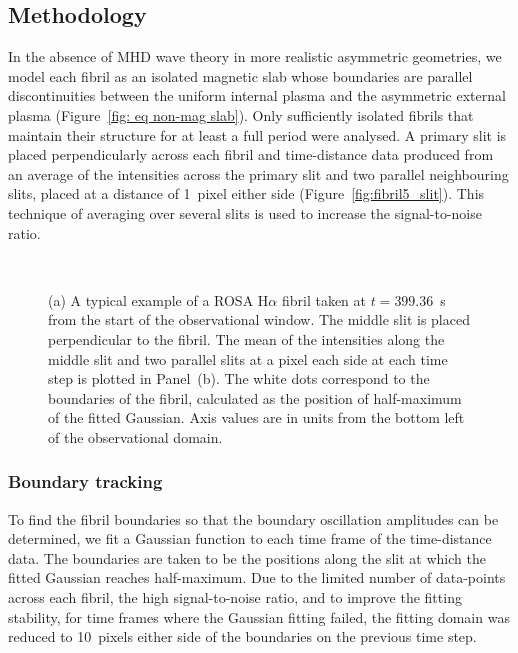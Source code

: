 \documentclass[12pt]{../style-files/ociamthesis}
\newcommand{\figdir}{../main/figures/chpt-4/} %
\begin{document}
\subsection{Methodology}

In the absence of MHD wave theory in more realistic asymmetric geometries, we model each fibril as an isolated magnetic slab whose boundaries are parallel discontinuities between the uniform internal plasma and the asymmetric external plasma (Figure~\ref{fig: eq non-mag slab}). Only sufficiently isolated fibrils that maintain their structure for at least a full period were analysed. A primary slit is placed perpendicularly across each fibril and time-distance data produced from an average of the intensities across the primary slit and two parallel neighbouring slits, placed at a distance of 1~pixel either side (Figure~\ref{fig:fibril5_slit}). This technique of averaging over several slits is used to increase the signal-to-noise ratio.

\begin{figure}
	\centering
	 \\
	\caption{(a) A typical example of a ROSA H$\alpha$ fibril taken at $t=399.36$~s from the start of the observational window. The middle slit is placed perpendicular to the fibril. The mean of the intensities along the middle slit and two parallel slits at a pixel each side at each time step is plotted in Panel~(b). The white dots correspond to the boundaries of the fibril, calculated as the position of half-maximum of the fitted Gaussian. Axis values are in units from the bottom left of the observational domain.}
\end{figure}


\subsubsection{Boundary tracking} \label{sec:boundary tracking}

To find the fibril boundaries so that the boundary oscillation amplitudes can be determined, we fit a Gaussian function to each time frame of the time-distance data. The boundaries are taken to be the positions along the slit at which the fitted Gaussian reaches half-maximum. Due to the limited number of data-points across each fibril, the high signal-to-noise ratio, and to improve the fitting stability, for time frames where the Gaussian fitting failed, the fitting domain was reduced to 10~pixels either side of the boundaries on the previous time step.
\end{document}
